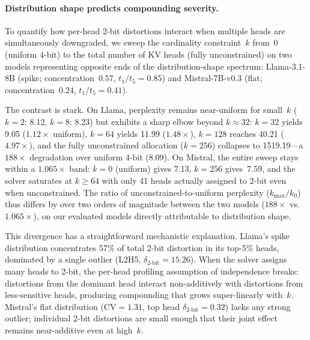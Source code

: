 
\paragraph{Distribution shape predicts compounding severity.}
To quantify how per-head 2-bit distortions interact when multiple heads are simultaneously downgraded, we sweep the cardinality constraint~$k$ from~0 (uniform 4-bit) to the total number of KV heads (fully unconstrained) on two models representing opposite ends of the distribution-shape spectrum: Llama-3.1-8B (spike; concentration~$0.57$, $t_1/t_5{=}0.85$) and Mistral-7B-v0.3 (flat; concentration~$0.24$, $t_1/t_5{=}0.41$). %

The contrast is stark.
On Llama, perplexity remains near-uniform for small~$k$ ($k{=}2$: 8.12, $k{=}8$: 8.23) but exhibits a sharp elbow beyond $k{\approx}32$: $k{=}32$ yields 9.05 ($1.12\times$ uniform), $k{=}64$ yields 11.99 ($1.48\times$), $k{=}128$ reaches 40.21 ($4.97\times$), and the fully unconstrained allocation ($k{=}256$) collapses to 1519.19---a $188\times$ degradation over uniform 4-bit (8.09). %
On Mistral, the entire sweep stays within a $1.065\times$ band: $k{=}0$ (uniform) gives 7.13, $k{=}256$ gives~7.59, and the solver saturates at $k{\geq}64$ with only 41 heads actually assigned to 2-bit even when unconstrained.
The ratio of unconstrained-to-uniform perplexity ($k_\text{max}/k_0$) thus differs by over two orders of magnitude between the two models ($188\times$ vs.\ $1.065\times$), on our evaluated models directly attributable to distribution shape. %

This divergence has a straightforward mechanistic explanation.
Llama's spike distribution concentrates 57\% of total 2-bit distortion in its top-5\% heads, dominated by a single outlier (L2H5, $\delta_{2\text{-bit}}{=}15.26$). %
When the solver assigns many heads to 2-bit, the per-head profiling assumption of independence breaks: distortions from the dominant head interact non-additively with distortions from less-sensitive heads, producing compounding that grows super-linearly with~$k$.
Mistral's flat distribution ($\text{CV}{=}1.31$, top head $\delta_{2\text{-bit}}{=}0.32$) lacks any strong outlier; individual 2-bit distortions are small enough that their joint effect remains near-additive even at high~$k$. %

